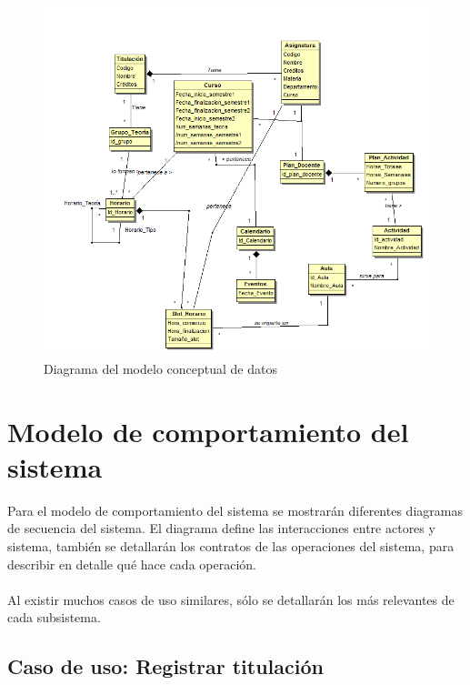 \documentclass{book}
\begin{document}
\begin{figure}[H] 
  \label{modelo-conceptual} 
	\begin{center}
    \includegraphics[scale=0.7]{./modeloconceptual.png}
  \end{center}
\caption{Diagrama del modelo conceptual de datos}
\end{figure}

\section{Modelo de comportamiento del sistema}

Para el modelo de comportamiento del sistema se mostrarán diferentes diagramas de secuencia del sistema. El diagrama define las interacciones entre actores y sistema, también se detallarán los contratos de las operaciones del sistema, para describir en detalle qué hace cada operación.
\paragraph{}
Al existir muchos casos de uso similares, sólo se detallarán los más relevantes de cada subsistema.

\subsection{Caso de uso: Registrar titulación}
\end{document}
